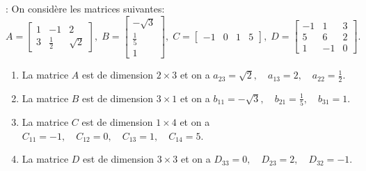 \documentclass[12pt,a4paper]{book}
\numberwithin{definition}{chapter}
\theoremstyle{plain}
\begin{document}
	\begin{example}:
		On considère les matrices suivantes:
		\begin{equation*}
			A=
			\begin{bmatrix}
				1 & -1 & 2\\
				3 &  \frac{1}{2} & \sqrt{2}
			\end{bmatrix},\;
			B=
			\begin{bmatrix}
				-\sqrt{3} \\
				\frac{1}{5}\\
				1
			\end{bmatrix},\;
			C=
			\begin{bmatrix}
				-1 & 0 & 1 & 5
			\end{bmatrix},\;
			D=
			\begin{bmatrix}
				-1 & 1 & 3 \\
				5 & 6 & 2 \\
				1 & -1 & 0
			\end{bmatrix}.
		\end{equation*}
		\begin{enumerate}
			\item La matrice $A$ est de dimension $2\times 3$ et on a $a_{23}=\sqrt{2},\quad a_{13}=2,\quad a_{22}=\frac{1}{2}$.
			\item La matrice $B$ est de dimension $3\times 1$ et on a $b_{11}=-\sqrt{3},\quad b_{21}=\frac{1}{5},\quad b_{31}=1$.
			\item La matrice $C$ est de dimension $1\times 4$ et on a $C_{11}=-1,\quad C_{12}=0,\quad C_{13}=1,\quad C_{14}=5$. 
			\item La matrice $D$ est de dimension $3\times 3$ et on a $D_{33}=0,\quad D_{23}=2,\quad D_{32}=-1$. 
		\end{enumerate} 
	\end{example}
\end{document}
